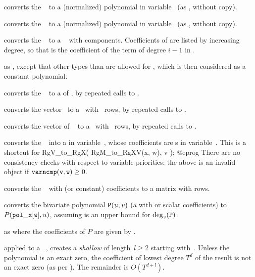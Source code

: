  converts the ~ to a
(normalized) polynomial in variable~ (as , without
copy).

 converts the ~
to a (normalized) polynomial in variable~ (as ,
without copy).

 converts the ~ to a
~ with  components. Coefficients of  are listed
by increasing degree, so that  is the coefficient of the term of
degree $i-1$ in .

 as , except that other
types than  are allowed for , which is then considered as a
constant polynomial.

 converts the ~ to a
 of , by repeated calls to .

 converts the vector~ to
a~ with ~rows, by repeated calls to .

 converts the vector of ~
to a~ with ~rows, by repeated calls to .

 converts the ~ into
a  in variable~, whose coefficients are s in
variable~. This is a shortcut for
\bprog
  RgV_to_RgX( RgM_to_RgXV(x, w), v );
@eprog\noindent
There are no consistency checks with respect to variable
priorities: the above is an invalid object if ${\tt varncmp(v, w)} \geq 0$.

 converts the ~ with
 (or constant) coefficients to a matrix with  rows.

 converts the bivariate polynomial
${\tt P}(u,v)$ (a  with  or scalar coefficients) to
$P({\tt pol\_x[w]},u)$, assuming  is an upper bound for
$\deg_v({\tt P})$.

as  where the coefficients of $P$ are given by
.

 applied to a ~, creates
a \emph{shallow}  of length~$l\geq 2$ starting with~.
Unless the polynomial is an exact zero, the coefficient of lowest degree
$T^d$ of the result is not an exact zero (as per ). The
remainder is $O(T^{d+l})$.

